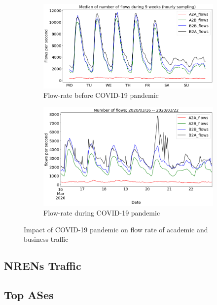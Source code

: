 \documentclass[10pt, journal, letterpaper]{IEEEtran}
\newcommand\figSzeMahdi{0.8}
\begin{document}
\begin{figure}
    \begin{subfigure}{\figSzeMahdi\columnwidth}
          \centering
          \includegraphics[width=\columnwidth]{img/BCO_acaBus_fps.png}
          \caption{Flow-rate before COVID-19 pandemic}
          \label{fig:BCO_acaBus_fps}
    \end{subfigure}
    \begin{subfigure}{\figSzeMahdi\columnwidth}
          \centering
          \includegraphics[width=\columnwidth]{img/CO2_acaBus_fps.png}
          \caption{Flow-rate during COVID-19 pandemic}
          \label{fig:CO_acaBus_fps}
    \end{subfigure}
    \caption{Impact of COVID-19 pandemic on flow rate of academic and business traffic}
    \label{fig:flowrate_acaBus_BCO_CO}
\end{figure}
\subsection{NRENs Traffic}

\subsection{Top ASes}
\end{document}
